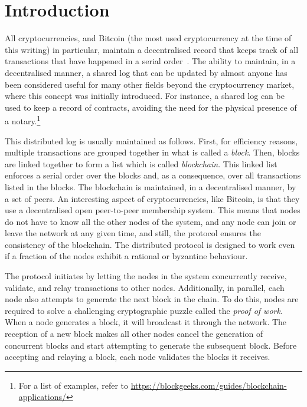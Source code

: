 \documentclass{dads}   %
\begin{document}
\section{Introduction}
All cryptocurrencies, and Bitcoin (the most used cryptocurrency at the time of  this writing) in particular, maintain a decentralised record that keeps track of all transactions that have happened in a serial order~\cite{nakamoto2008bitcoin}. The ability to maintain, in a decentralised manner, a shared log that can be updated by almost anyone has been considered useful for many other fields beyond the cryptocurrency market, where this concept was initially introduced. For instance, a shared log can be used to keep a record of contracts, avoiding the need for the physical presence of a notary.\footnote{For a list of examples, refer to \url{https://blockgeeks.com/guides/blockchain-applications/}}

This distributed log is usually maintained as follows.
First, for efficiency reasons, multiple transactions are grouped together in what is called a \textsl{block}. Then, blocks are linked together to form a list which is called \textit{blockchain}. This linked list enforces a serial order over the blocks and, as a consequence, over all transactions listed in the blocks. The blockchain is maintained, in a decentralised manner, by a set of peers. An interesting aspect of cryptocurrencies, like Bitcoin, is that they use a decentralised open peer-to-peer membership system. This means that nodes do not have to know all the other nodes of the system, and any node can join or leave the network at any given time, and still, the protocol ensures the  consistency of the blockchain. The distributed protocol is designed to work even if a fraction of the nodes exhibit a rational or byzantine behaviour.

The protocol initiates by letting the nodes in the system concurrently receive, validate, and relay transactions to other nodes. Additionally, in parallel, each node also attempts to generate the next block in the chain. To do this,  nodes are required to solve a challenging cryptographic puzzle called the \textit{proof of work}. When a node generates a block, it will broadcast it through the network. The reception of a new block makes all other nodes cancel the generation of concurrent blocks and start attempting to generate the subsequent block. Before accepting and relaying a block, each node validates the blocks it receives.
\end{document}
